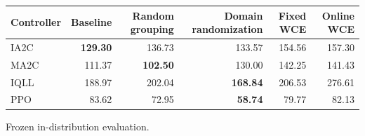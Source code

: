 \begin{tabular}{lrrrrr}
\hline
Controller & Baseline & Random grouping & Domain randomization & Fixed WCE & Online WCE \\
\hline
IA2C & \textbf{129.30} & 136.73 & 133.57 & 154.56 & 157.30 \\
MA2C & 111.37 & \textbf{102.50} & 130.00 & 142.25 & 141.43 \\
IQLL & 188.97 & 202.04 & \textbf{168.84} & 206.53 & 276.61 \\
PPO & 83.62 & 72.95 & \textbf{58.74} & 79.77 & 82.13 \\
\hline
\end{tabular}
Frozen in-distribution evaluation.
